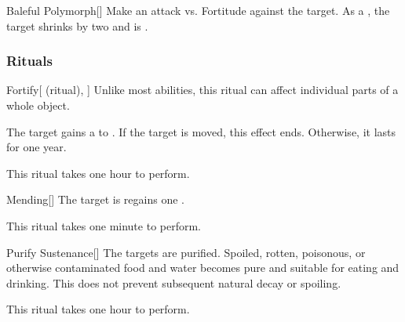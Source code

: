 \lowercase{\hypertarget{spell:Baleful Polymorph}{}}\label{spell:Baleful Polymorph}
\begin{freeability}[Rank 7]{\hypertarget{spell:Baleful Polymorph}{Baleful Polymorph}}[]
Make an attack vs. Fortitude against the target.
\hit As a , the target shrinks by two  and is .
\end{freeability}
\vspace{0.25em}



\subsubsection{Rituals}


\lowercase{\hypertarget{spell:Fortify}{}}\label{spell:Fortify}
\begin{attuneability}[Rank 1]{\hypertarget{spell:Fortify}{Fortify}}[ (ritual), ]
Unlike most abilities, this ritual can affect individual parts of a whole object.

The target gains a   to .
If the target is moved, this effect ends.
Otherwise, it lasts for one year.

This ritual takes one hour to perform.
\end{attuneability}
\vspace{0.25em}



\lowercase{\hypertarget{spell:Mending}{}}\label{spell:Mending}
\begin{apability}[Rank 1]{\hypertarget{spell:Mending}{Mending}}[]
The target is regains one .

This ritual takes one minute to perform.
\end{apability}
\vspace{0.25em}



\lowercase{\hypertarget{spell:Purify Sustenance}{}}\label{spell:Purify Sustenance}
\begin{apability}[Rank 1]{\hypertarget{spell:Purify Sustenance}{Purify Sustenance}}[]
The targets are purified.
Spoiled, rotten, poisonous, or otherwise contaminated food and water becomes pure and suitable for eating and drinking.
This does not prevent subsequent natural decay or spoiling.

This ritual takes one hour to perform.
\end{apability}
\vspace{0.25em}




